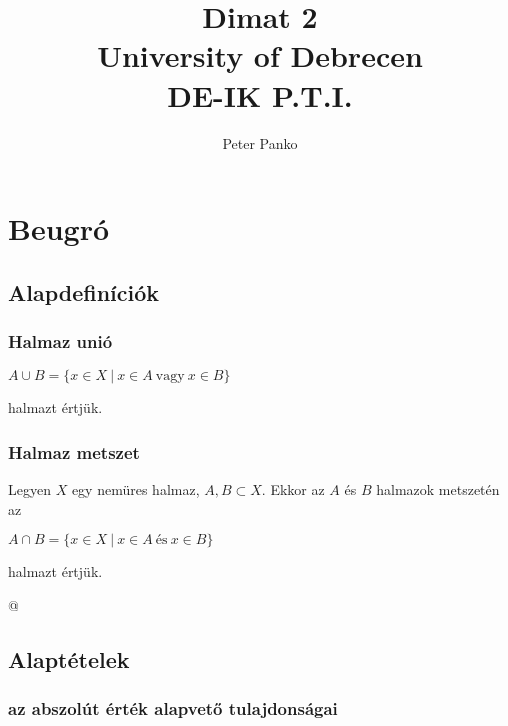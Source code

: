 \documentclass[12pt]{article}
\title{\Huge Dimat 2 \\
\LARGE University of Debrecen \\
\large DE-IK P.T.I.}
\author{Peter Panko}
\begin{document}
\clearpage\maketitle
\thispagestyle{empty}
\newpage


\tableofcontents 

\newpage




\section{Beugró}


\subsection{Alapdefiníciók}

\subsubsection{Halmaz unió}

\begin{center}
$A \cup B = \{x \in X\ |\ x \in A\ \text{vagy}\ x \in B\}$
\end{center}
halmazt értjük.

\subsubsection{Halmaz metszet}

Legyen $X$ egy nemüres halmaz, $A, B \subset X$. Ekkor az $A$ és $B$ halmazok metszetén az
\begin{center}
$A \cap B = \{x \in X\ |\ x \in A\ \text{és}\ x \in B\}$
\end{center}
halmazt értjük.


@

 
\subsection{Alaptételek}

\subsubsection{az abszolút érték alapvető tulajdonságai}
\end{document}
